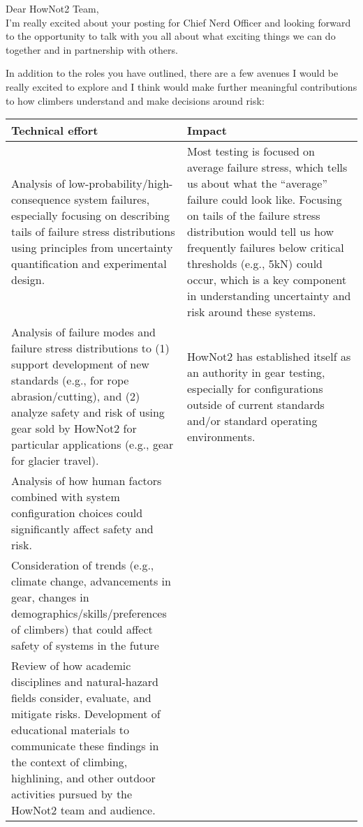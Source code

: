 \documentclass[10pt]{article}
\begin{document}
	

\noindent Dear HowNot2 Team,\\

I'm really excited about your posting for Chief Nerd Officer and looking forward to the opportunity to talk with you all about what exciting things we can do together and in partnership with others.

In addition to the roles you have outlined, there are a few avenues I would be really excited to explore and I think would make further meaningful contributions to how climbers understand and make decisions around risk:
\begin{center}
\begin{tabular}{|p{0.5\linewidth}|p{0.5\linewidth}|}
\hline
\textbf{Technical effort} & \textbf{Impact} \\ \hline \hline
Analysis of low-probability/high-consequence system failures, especially focusing on describing tails of failure stress distributions using principles from uncertainty quantification and experimental design. & Most testing is focused on average failure stress, which tells us about what the ``average'' failure could look like. Focusing on tails of the failure stress distribution would tell us how frequently failures below critical thresholds (e.g., 5kN) could occur, which is a key component in understanding uncertainty and risk around these systems. \\ \hline
Analysis of failure modes and failure stress distributions to (1) support development of new standards (e.g., for rope abrasion/cutting), and (2) analyze safety and risk of using gear sold by HowNot2 for particular applications (e.g., gear for glacier travel). & HowNot2 has established itself as an authority in gear testing, especially for configurations outside of current standards and/or standard operating environments. \\ \hline
Analysis of how human factors combined with system configuration choices could significantly affect safety and risk. & \\ \hline
Consideration of trends (e.g., climate change, advancements in gear, changes in demographics/skills/preferences of climbers) that could affect safety of systems in the future & \\ \hline
Review of how academic disciplines and natural-hazard fields consider, evaluate, and mitigate risks. Development of educational materials to communicate these findings in the context of climbing, highlining, and other outdoor activities pursued by the HowNot2 team and audience. & \\ \hline
\end{tabular}
\end{center}
\end{document}
